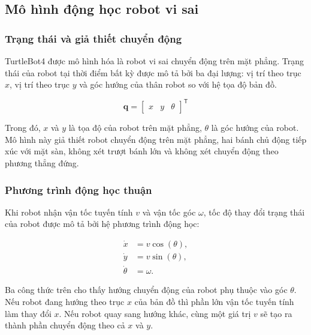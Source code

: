 \subsection{Mô hình động học robot vi sai}
\label{subsec:differential-drive-kinematics}

\subsubsection{Trạng thái và giả thiết chuyển động}
\label{subsubsec:state-assumptions}

TurtleBot4 được mô hình hóa là robot vi sai chuyển động trên mặt phẳng. Trạng thái của robot tại thời điểm bất kỳ được mô tả bởi ba đại lượng: vị trí theo trục $x$, vị trí theo trục $y$ và góc hướng của thân robot so với hệ tọa độ bản đồ.

\begin{equation}
    \mathbf{q}
    =
    \begin{bmatrix}
        x & y & \theta
    \end{bmatrix}^{\mathsf{T}}
    \label{eq:robot-state}
\end{equation}

Trong đó, $x$ và $y$ là tọa độ của robot trên mặt phẳng, $\theta$ là góc hướng của robot. Mô hình này giả thiết robot chuyển động trên mặt phẳng, hai bánh chủ động tiếp xúc với mặt sàn, không xét trượt bánh lớn và không xét chuyển động theo phương thẳng đứng.

\subsubsection{Phương trình động học thuận}
\label{subsubsec:forward-kinematics}

Khi robot nhận vận tốc tuyến tính $v$ và vận tốc góc $\omega$, tốc độ thay đổi trạng thái của robot được mô tả bởi hệ phương trình động học:

\begin{align}
    \dot{x} &= v\cos(\theta), \label{eq:diff-drive-xdot}\\
    \dot{y} &= v\sin(\theta), \label{eq:diff-drive-ydot}\\
    \dot{\theta} &= \omega. \label{eq:diff-drive-thetadot}
\end{align}

Ba công thức trên cho thấy hướng chuyển động của robot phụ thuộc vào góc $\theta$. Nếu robot đang hướng theo trục $x$ của bản đồ thì phần lớn vận tốc tuyến tính làm thay đổi $x$. Nếu robot quay sang hướng khác, cùng một giá trị $v$ sẽ tạo ra thành phần chuyển động theo cả $x$ và $y$.

